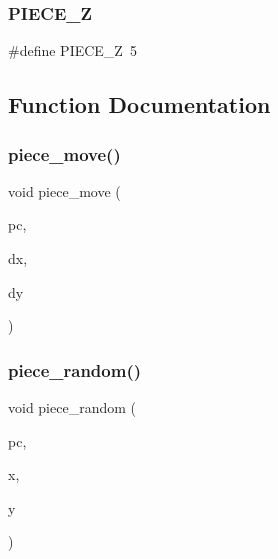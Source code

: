 \mbox{\label{piece_8h_aee707398916fd4752f85e771787c023c}} 
\subsubsection{P\+I\+E\+C\+E\+\_\+Z}
{\footnotesize\ttfamily \#define P\+I\+E\+C\+E\+\_\+Z~5}



\subsection{Function Documentation}
\mbox{\label{piece_8h_a4642eff00c1b15fd507057c44e6736a0}} 
\subsubsection{piece\+\_\+move()}
{\footnotesize\ttfamily void piece\+\_\+move (\begin{DoxyParamCaption}\item[{struct \textbf{ piece} $\ast$}]{pc,  }\item[{int}]{dx,  }\item[{int}]{dy }\end{DoxyParamCaption})\hspace{0.3cm}{\ttfamily [inline]}}

\mbox{\label{piece_8h_af5ed528ee08179282cc95a5431aba453}} 
\subsubsection{piece\+\_\+random()}
{\footnotesize\ttfamily void piece\+\_\+random (\begin{DoxyParamCaption}\item[{struct \textbf{ piece} $\ast$}]{pc,  }\item[{size\+\_\+t}]{x,  }\item[{size\+\_\+t}]{y }\end{DoxyParamCaption})\hspace{0.3cm}{\ttfamily [inline]}}

\mbox{\label{piece_8h_af73ec0a224e50fee25089a256145bbd2}} 
